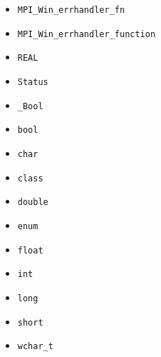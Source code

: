 \begin{multicols}{3}
\begin{itemize}
\item \texttt{MPI_Win_errhandler_fn}~\pageref{def:MPI_Win_errhandler_fn}
\item \texttt{MPI_Win_errhandler_function}~\pageref{def:MPI_Win_errhandler_function}
\item \texttt{REAL}~\pageref{def:REAL}
\item \texttt{Status}~\pageref{def:Status}
\item \texttt{_Bool}~\pageref{def:_Bool}
\item \texttt{bool}~\pageref{def:bool}
\item \texttt{char}~\pageref{def:char}
\item \texttt{class}~\pageref{def:class}
\item \texttt{double}~\pageref{def:double}
\item \texttt{enum}~\pageref{def:enum}
\item \texttt{float}~\pageref{def:float}
\item \texttt{int}~\pageref{def:int}
\item \texttt{long}~\pageref{def:long}
\item \texttt{short}~\pageref{def:short}
\item \texttt{wchar_t}~\pageref{def:wchar_t}
\end{itemize}
\end{multicols}
